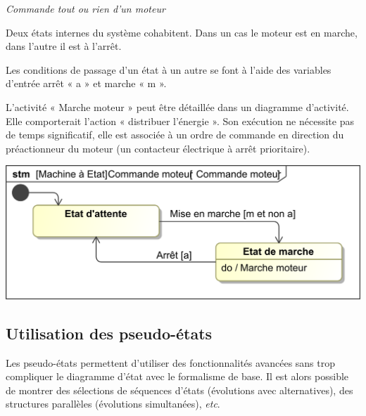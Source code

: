 \documentclass[10pt,fleqn]{article} %
\begin{document}
\begin{exemple}
\textit{Commande tout ou rien d'un moteur}

\vspace{.2cm}
\noindent
\begin{minipage}[c]{.48\linewidth}
Deux états internes du système cohabitent. Dans un cas le moteur est en marche, dans l’autre il est à l’arrêt.

Les conditions de passage d’un état à un autre se font à l’aide des variables d’entrée arrêt « a » et marche « m ».


L’activité « Marche moteur » peut être détaillée dans un diagramme d’activité. Elle comporterait l’action « distribuer l’énergie ». Son exécution ne nécessite pas de temps significatif, elle est associée à un ordre de commande en direction du préactionneur du moteur (un contacteur électrique à arrêt prioritaire).
\end{minipage} \hfill
\begin{minipage}[c]{.46\linewidth}
\begin{center}
\includegraphics[width=\textwidth]{images/Commandemoteur}
\end{center}
\end{minipage}


\end{exemple}

\subsection{Utilisation des pseudo-états}


\begin{methode}
Les pseudo-états permettent d’utiliser des fonctionnalités avancées sans trop compliquer le diagramme d’état avec le formalisme de base.
Il est alors possible de montrer des sélections de séquences d’états (évolutions avec alternatives), des structures parallèles (évolutions simultanées), \textit{etc}.
\end{methode}
\end{document}

